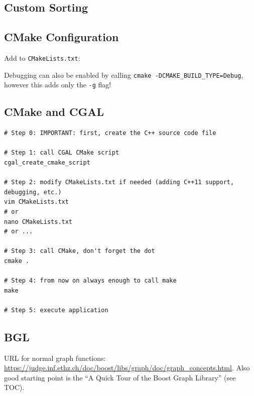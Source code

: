 \documentclass[a4paper,titlepage]{article}
\begin{document}
\subsection{Custom Sorting}


\subsection{CMake Configuration}
Add to \texttt{CMakeLists.txt}:


Debugging can also be enabled by calling \texttt{cmake -DCMAKE\_BUILD\_TYPE=Debug}, however this adds only the \texttt{-g} flag!

\subsection{CMake and CGAL}
\begin{lstlisting}
# Step 0: IMPORTANT: first, create the C++ source code file

# Step 1: call CGAL CMake script
cgal_create_cmake_script

# Step 2: modify CMakeLists.txt if needed (adding C++11 support, debugging, etc.)
vim CMakeLists.txt
# or
nano CMakeLists.txt
# or ...

# Step 3: call CMake, don't forget the dot
cmake .

# Step 4: from now on always enough to call make
make

# Step 5: execute application
\end{lstlisting}

\subsection{BGL}
URL for normal graph functions: \url{https://judge.inf.ethz.ch/doc/boost/libs/graph/doc/graph_concepts.html}. Also good starting point is the ``A Quick Tour of the Boost Graph Library'' (see TOC).


\end{document}
